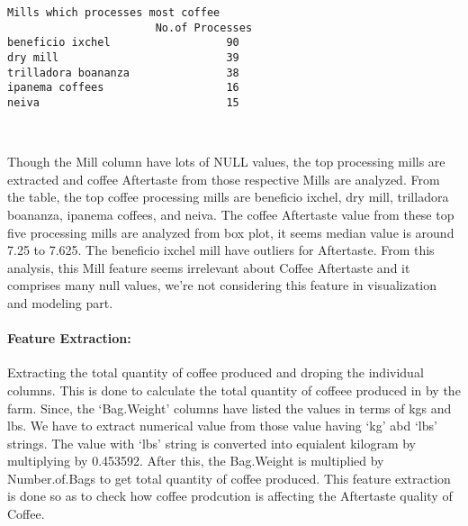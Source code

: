 \documentclass[11pt]{article}
\begin{document}
    \begin{Verbatim}[commandchars=\\\{\}]
Mills which processes most coffee
                       No.of Processes
beneficio ixchel                  90
dry mill                          39
trilladora boananza               38
ipanema coffees                   16
neiva                             15
    \end{Verbatim}

    \begin{center}
    \end{center}
    { \hspace*{\fill} \\}
    
    Though the Mill column have lots of NULL values, the top processing
mills are extracted and coffee Aftertaste from those respective Mills
are analyzed. From the table, the top coffee processing mills are
beneficio ixchel, dry mill, trilladora boananza, ipanema coffees, and
neiva. The coffee Aftertaste value from these top five processing mills
are analyzed from box plot, it seems median value is around 7.25 to
7.625. The beneficio ixchel mill have outliers for Aftertaste. From this
analysis, this Mill feature seems irrelevant about Coffee Aftertaste and
it comprises many null values, we're not considering this feature in
visualization and modeling part.

    \hypertarget{feature-extraction}{%
\paragraph{Feature Extraction:}\label{feature-extraction}}

Extracting the total quantity of coffee produced and droping the
individual columns. This is done to calculate the total quantity of
coffeee produced in by the farm. Since, the `Bag.Weight' columns have
listed the values in terms of kgs and lbs. We have to extract numerical
value from those value having `kg' abd `lbs' strings. The value with
`lbs' string is converted into equialent kilogram by multiplying by
0.453592. After this, the Bag.Weight is multiplied by Number.of.Bags to
get total quantity of coffee produced. This feature extraction is done
so as to check how coffee prodcution is affecting the Aftertaste quality
of Coffee.
\end{document}

